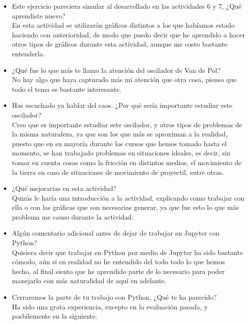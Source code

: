 \documentclass{article}
\begin{document}
    \begin{itemize}
    \item Este ejercicio pareciera simular al desarrollado en las actividades 6 y 7, ¿Qué aprendiste nuevo? \\ En esta actividad se utilizarón gráficos distintos a los que habíamos estado haciendo con anterioridad, de modo que puedo decir que he aprendido a hacer otros tipos de gráficos durante esta actividad, aunque me costo bastante entenderla.
    \item ¿Qué fue lo que más te llamo la atención del oscilador de Van de Pol? \\ No hay algo que haya capturado más mi atención que otra cosa, pienso que todo el tema es bastante interesante.
    \item Has escuchado ya hablar del caos. ¿Por qué sería importante estudiar este oscilador? \\ Creo que es importante estudiar este oscilador, y otros tipos de problemas de la misma naturaleza, ya que son los que más se aproximan a la realidad, puesto que en su mayoría durante los cursos que hemos tomado hasta el momento, se han trabajado problemas en situaciones ideales, es decir, sin tomar en cuenta cosas como la fricción en distintos medios, el movimiento de la tierra en caso de situaciones de movimiento de proyectil, entre otras.
    \item ¿Qué mejorarías en esta actividad? \\ Quizás le haría una introducción a la actividad, explicando como trabajar con ella o con las gráficas que son necesarias generar, ya que fue esto lo que más problema me causo durante la actividad.
    \item Algún comentario adicional antes de dejar de trabajar en Jupyter con Python? \\ Quisiera decir que trabajar en Python por medio de Jupyter ha sido bastante cómodo, aún si en realidad no he entendido del todo todo lo que hemos hecho, al final siento que he aprendido parte de lo necesario para poder manejarlo con más naturalidad de aquí en adelante.
    \item Cerraremos la parte de tu trabajo con Python, ¿Qué te ha parecido? \\ Ha sido una grata experiencia, excepto en la evaluación pasada, y posbilemente en la siguiente.
    \end{itemize}
\end{document}

